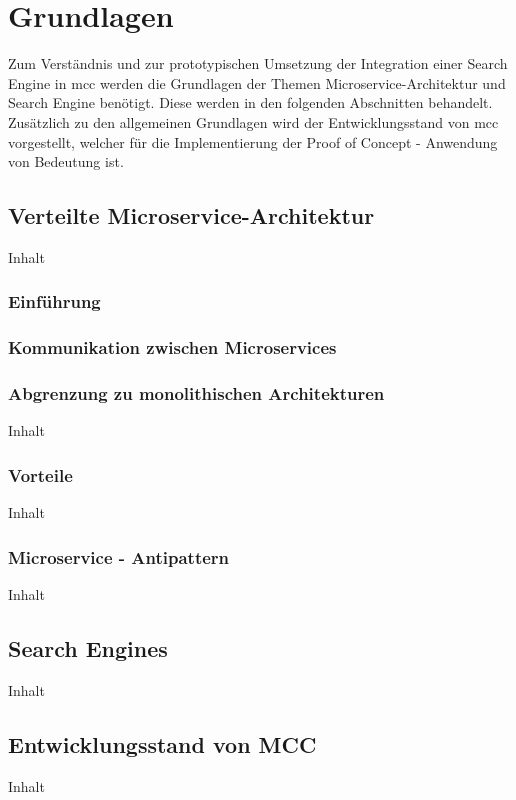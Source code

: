 \chapter{Grundlagen\label{chap2:Zweites-Kapitel}}

Zum Verständnis und zur prototypischen Umsetzung der Integration einer Search Engine in \gls{mcc} werden die Grundlagen der Themen \glqq Microservice-Architektur\grqq{} und \glqq Search Engine\grqq{} benötigt. Diese werden in den folgenden Abschnitten behandelt. Zusätzlich zu den allgemeinen Grundlagen wird der Entwicklungsstand von \gls{mcc} vorgestellt, welcher für die Implementierung der Proof of Concept - Anwendung von Bedeutung ist.

\section{Verteilte Microservice-Architektur\label{sec2.1:Unterpunkt-1}}

Inhalt

\subsection{Einführung\label{subsec2.1.1:Unterunterpunkt-1}}

\subsection{Kommunikation zwischen Microservices\label{subsec2.1.1:Unterunterpunkt-1}}

\subsection{Abgrenzung zu monolithischen Architekturen\label{subsec2.1.1:Unterunterpunkt-1}}

Inhalt

\subsection{Vorteile\label{subsec2.1.2:Unterunterpunkt-2}}

Inhalt

\subsection{Microservice - Antipattern\label{subsec2.1.3:Unterunterpunkt-3}}

Inhalt

\section{Search Engines\label{sec2.2:Unterpunkt-2}}

Inhalt

\section{Entwicklungsstand von MCC\label{sec2.3:Unterpunkt-3}}

Inhalt